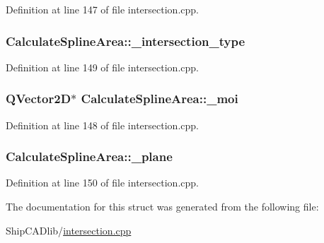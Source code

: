 Definition at line 147 of file intersection.\-cpp.

\hypertarget{structCalculateSplineArea_aae716b66f114f0217e68efc79ca9cc91}{
\subsubsection[{\-\_\-intersection\-\_\-type}]{ Calculate\-Spline\-Area\-::\-\_\-intersection\-\_\-type}}\label{structCalculateSplineArea_aae716b66f114f0217e68efc79ca9cc91}


Definition at line 149 of file intersection.\-cpp.

\hypertarget{structCalculateSplineArea_a5d4eebaf188d12a2f30ed7f28bf3d57f}{
\subsubsection[{\-\_\-moi}]{\setlength{\rightskip}{0pt plus 5cm}Q\-Vector2\-D$\ast$ Calculate\-Spline\-Area\-::\-\_\-moi}}\label{structCalculateSplineArea_a5d4eebaf188d12a2f30ed7f28bf3d57f}


Definition at line 148 of file intersection.\-cpp.

\hypertarget{structCalculateSplineArea_ab6c7f0e103a21db017e7330a31e9f984}{
\subsubsection[{\-\_\-plane}]{ Calculate\-Spline\-Area\-::\-\_\-plane}}\label{structCalculateSplineArea_ab6c7f0e103a21db017e7330a31e9f984}


Definition at line 150 of file intersection.\-cpp.



The documentation for this struct was generated from the following file\-:\begin{DoxyCompactItemize}
\item 
Ship\-C\-A\-Dlib/\hyperlink{intersection_8cpp}{intersection.\-cpp}\end{DoxyCompactItemize}
